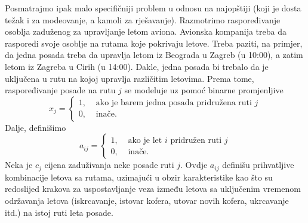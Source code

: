 \documentclass[a4paper, utf8, 11pt, colorlinks]{book}
\theoremstyle{definition}
\begin{document}
Posmatrajmo ipak malo specifičniji problem u odnosu na najopštiji (koji je dosta težak i za modeovanje, a kamoli za rješavanje). 
Razmotrimo raspoređivanje osoblja zaduženog za upravljanje letom aviona. 
Avionska kompanija treba da rasporedi svoje osoblje na rutama koje pokrivaju letove. Treba paziti, na primjer, da jedna posada treba da upravlja letom iz  Beograda u Zagreb (u 10:00), a zatim letom iz Zagreba u Cirih (u 14:00). Dakle, jedna posada bi trebalo da je uključena u rutu na kojoj upravlja različitim letovima. Prema tome, raspoređivanje posade na rutu $j$ se modeluje uz pomoć binarne promjenljive 
$$x_j = \begin{cases}
    1,& \mbox{ ako je barem jedna posada pridružena ruti } j \\
    0,& \mbox{ inače}. 
\end{cases}
$$
Dalje, definišimo 
$$a_{ij}= \begin{cases}
             1,& \mbox{ ako je let } i \mbox{ pridružen ruti } j \\
             0,& \mbox{ inače}.
        \end{cases}
$$
Neka je $c_j$ cijena zaduživanja neke posade ruti $j$. Ovdje $a_{ij}$ definišu prihvatljive kombinacije letova sa rutama, uzimajući u obzir  karakteristike kao što su redoslijed krakova za uspostavljanje veza između letova sa uključenim vremenom  održavanja letova (iskrcavanje, istovar  kofera, utovar   novih kofera, ukrcavanje itd.) na istoj ruti leta posade.   
\end{document}
